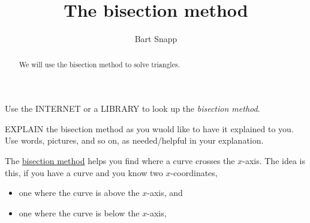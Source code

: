 \documentclass{ximera}
\title{The bisection method}
\author{Bart Snapp}
\begin{document}
\begin{abstract}
  We will use the bisection method to solve triangles.
\end{abstract}
\maketitle

\begin{question}
  Use the INTERNET or a LIBRARY to look up the \textit{bisection
    method}.

  EXPLAIN the bisection method as you wuold like to have it
  explained to you.  Use words, pictures, and so on, as needed/helpful
  in your explanation.
  \begin{freeResponse}
    The \underline{bisection method} helps you find where a curve
    crosses the $x$-axis. The idea is this, if you have a curve and
    you know two $x$-coordinates,
    \begin{itemize}
      \item one where the curve is above the
        $x$-axis, and
      \item one where the curve is below the $x$-axis,
    \end{itemize}
    \begin{center}
\end{center}
\end{freeResponse}
\end{question}
\end{document}
